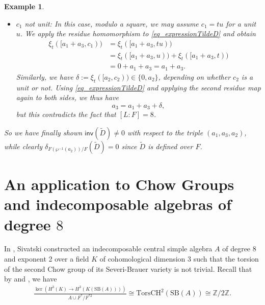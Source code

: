 \documentclass{amsart}
\newtheorem{example}[definition]{Example}
\numberwithin{equation}{section}
\newcommand{\Z}{\mathbb{Z}}
\newcommand{\an}{\mathrm{an}} %
\newcommand{\qpf}[1]{\langle\!\langle #1]\!]}
\newcommand{\dbrac}[1]{(\!(#1)\!)}
\newcommand{\quat}[1]{[#1)}
\newcommand{\inv}{\mathsf{inv}}
\newcommand{\torsChow}{\mathrm{Tors CH}^2}
\newcommand{\SevBrauer}{\mathrm{SB}}
\begin{document}
\begin{example}
\begin{itemize}
            In this case, we obtain
            \begin{align*}
                \delta_t^2(\qpf{stc_1, a_3}) = s\overline{c_1}[1, a_3].
            \end{align*}
            We compare the Arf invariants and use that $\qpf{e, f}$ is defined over $F\dbrac t$, implying that its residue form represents an element in $F$, and thus we have 
            \[\delta_t^2(\qpf{f, e}) = p[1, a_3]\]
            for some $p \in F^\ast$.
            This now implies
            \[(\varphi_E)_\an \cong p\overline {c_1}[1, a_3],\]
            which is a contradiction to the fact that $(\varphi_E)_\an$ is not defined over $F$.
        \item $c_1$ not unit: 
            In this case, modulo a square, we may assume $c_1 = tu$ for a unit $u$.
            We apply the residue homomorphism to \eqref{eq_expressionTildeD} and obtain 
            \begin{align*}
                \xi_t(\quat{a_1+ a_3, c_1}) &= \xi_t(\quat{a_1+ a_3, tu}) \\
                &= \xi_t(\quat{a_1+ a_3, u}) + \xi_t(\quat{a_1+ a_3, t})\\
                &= 0 + a_1 + a_3 = a_1 + a_3.
            \end{align*}
            Similarly, we have $\delta := \xi_t(\quat{a_2, c_2}) \in \{0, a_2\}$, depending on whether $c_2$ is a unit or not.
            Using \eqref{eq_expressionTildeD} and applying the second residue map again to both sides, we thus have
            \[a_3 = a_1 + a_3 + \delta,\]
            but this contradicts the fact that $[L : F] = 8$.
    \end{itemize}
    
    So we have finally shown $\inv(\tilde D) \neq 0$ with respect to the triple $(a_1, a_3, a_2)$, while clearly $\delta_{F(\wp^{-1}(a_2)) / F}(\tilde D) = 0$ since $\tilde D$ is defined over $F$.
\end{example}

\section{An application to Chow Groups and indecomposable algebras of degree $8$} \label{sec_ChowGroups}

In \cite{Sivatski_CohoInv}, Sivatski constructed an indecomposable central simple algebra $A$ of degree 8 and exponent 2 over a field $K$ of cohomological dimension 3 such that the torsion of the second Chow group of its Severi-Brauer variety is not trivial.
Recall that by \cite[Theorem A.1]{IzhboldinKarpenko_GenericSplittingFields} and \cite[Proposition 5.1]{Karpenko_Codim2Cycles}, we have
\begin{align}\label{eq_IsoTorsChow}
	\frac{\ker(H^3(K) \to H^3(K(\SevBrauer(A))))}{A \cup F^*/F^{*2}} \cong \torsChow(\SevBrauer(A)) \cong \Z/2\Z.
\end{align}
\end{document}
